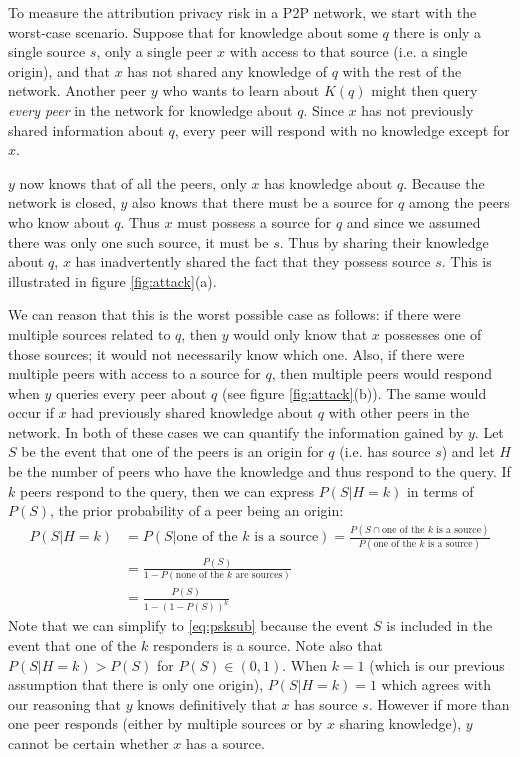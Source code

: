 \documentclass{article}
\newcommand{\figref}[1]{figure \ref{fig:#1}}
\begin{document}
To measure the attribution privacy risk in a P2P network, we start with the worst-case scenario. Suppose that for knowledge about some $q$
there is only a single source $s$, only a single peer $x$ with access to that
source (i.e. a single origin), and that $x$ has not shared any knowledge of $q$
with the rest of the network. Another peer $y$ who wants to learn about $K(q)$
might then query {\it every peer} in the network for knowledge about $q$. Since
$x$ has not previously shared information about $q$, every peer will respond
with no knowledge except for $x$.

$y$ now knows that of all the peers, only $x$ has knowledge about $q$. Because
the network is closed, $y$ also knows that there must be a source for $q$ among
the peers who know about $q$. Thus $x$ must possess a source for $q$ and since
we assumed there was only one such source, it must be $s$. Thus by sharing their
knowledge about $q$, $x$ has inadvertently shared the fact that they possess
source $s$. This is illustrated in \figref{attack}(a).


We can reason that this is the worst possible case as follows: if there were
multiple sources related to $q$, then $y$ would only know that $x$ possesses one
of those sources; it would not necessarily know which one. Also, if there were
multiple peers with access to a source for $q$, then multiple peers would
respond when $y$ queries every peer about $q$ (see \figref{attack}(b)). The same would occur if $x$ had
previously shared knowledge about $q$ with other peers in the network. In both
of these cases we can quantify the information gained by $y$. Let $S$ be the
event that one of the peers is an origin for $q$ (i.e. has
source $s$) and let $H$ be the number of peers who have the knowledge and thus
respond to the query.
If $k$ peers respond to the query, then we can express $P(S|H=k)$ in terms of
$P(S)$, the prior probability of a peer being an origin:
\begin{align}
	P(S|H=k)&=P(S|\text{one of the $k$ is a source})=\frac{P(S\cap\text{one of
	the $k$ is a source})}{P(\text{one of the $k$ is a source})}\nonumber\\
	&=\frac{P(S)}{1-P(\text{none of the $k$ are sources})}\label{eq:psksub}\\
	&=\frac{P(S)}{1-(1-P(S))^k}\label{eq:psk}
\end{align}
Note that we can simplify to \eqref{eq:psksub} because the event $S$ is included
in the event that one of the $k$ responders is a source. Note also that
$P(S|H=k)>P(S)$ for $P(S)\in(0,1)$. When $k=1$ (which is our previous assumption
that there is only one origin), $P(S|H=k)=1$ which agrees with our reasoning
that $y$ knows definitively that $x$ has source $s$. However if more than one peer
responds (either by multiple sources or by $x$ sharing knowledge), $y$ cannot be
certain whether $x$ has a source.
\end{document}
